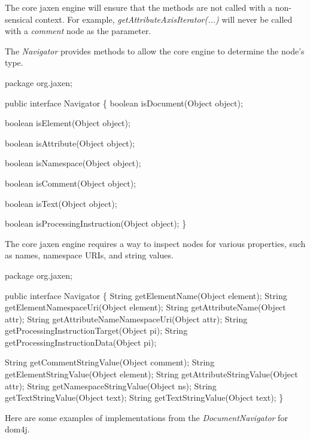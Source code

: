\documentclass[20pt,landscape,headrule,footrule]{foils}
\begin{document}
The core jaxen engine will ensure that the methods are not called with
a non-sensical context.  For example,
\emph{getAttributeAxisIterator(...)} will never be called with a 
\emph{comment} node as the parameter.

The \emph{Navigator} provides methods to allow the core engine
to determine the node's type.


\begin{codelisting}
package org.jaxen;

public interface Navigator
\{
    boolean isDocument(Object object);

    boolean isElement(Object object);

    boolean isAttribute(Object object);

    boolean isNamespace(Object object);

    boolean isComment(Object object);

    boolean isText(Object object);

    boolean isProcessingInstruction(Object object);
\}
\end{codelisting}


The core jaxen engine requires a way to inspect nodes for various
properties, such as names, namespace URIs, and string values.

\begin{codelisting} 
package org.jaxen;

public interface Navigator
\{
    String getElementName(Object element);
    String getElementNamespaceUri(Object element);
    String getAttributeName(Object attr);
    String getAttributeNameNamespaceUri(Object attr);
    String getProcessingInstructionTarget(Object pi);
    String getProcessingInstructionData(Object pi);

    String getCommentStringValue(Object comment);
    String getElementStringValue(Object element);
    String getAttributeStringValue(Object attr);
    String getNamespaceStringValue(Object ns);
    String getTextStringValue(Object text);
    String getTextStringValue(Object text);
\}
\end{codelisting} 

Here are some examples of implementations from the
\emph{DocumentNavigator} for dom4j.  

\end{document}
